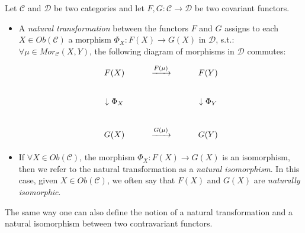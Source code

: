 \begin{definition}
    Let $\mathcal{C}$ and $\mathcal{D}$ be two categories and let $F,G: \mathcal{C} \to \mathcal{D}$ be two covariant functors.
    \begin{itemize}
        \item A \textit{natural transformation} between the functors $F$ and $G$ assigns to each $X \in Ob(\mathcal{C})$ a morphism $\Phi_X: F(X) \to G(X)$ in $\mathcal{D}$, s.t.: $\forall \mu \in Mor_\mathcal{C} (X,Y)$, the following diagram of morphisms in $\mathcal{D}$ commutes:
        $$\begin{tikzcd}
            F(X) & \xrightarrow[]{F(\mu)} & F(Y) \\
            \downarrow \Phi_X && \downarrow \Phi_Y\\
            G(X) & \xrightarrow[]{G(\mu)} & G(Y)
        \end{tikzcd}$$
        
        \item If $\forall X \in Ob(\mathcal{C})$, the morphism $\Phi_X : F(X) \to G(X)$ is an isomorphism, then we refer to the natural transformation as a \textit{natural isomorphism}. In this case, given $X \in Ob(\mathcal{C})$, we often say that $F(X)$ and $G(X)$ are \textit{naturally isomorphic}.
    \end{itemize}
    The same way one can also define the notion of a natural transformation and a natural isomorphism between two contravariant functors.
\end{definition}

